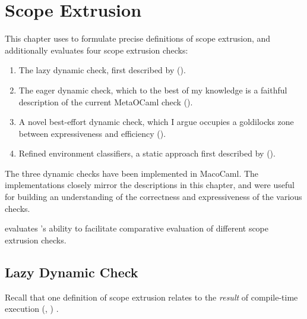 \chapter{Scope Extrusion}\label{chapter:scope-extrusion}
This chapter uses \calculusName{} to formulate precise definitions of scope extrusion, and additionally evaluates four scope extrusion checks: 
\begin{enumerate}
  \item The lazy dynamic check, first described by \citet{kiselyov-14} ().
  \item The eager dynamic check, which to the best of my knowledge is a faithful description of the current MetaOCaml check ().
  \item A novel best-effort dynamic check, which I argue occupies a goldilocks zone between expressiveness and efficiency ().
  \item Refined environment classifiers, a static approach first described by \citet{kiselyov-16} ().
\end{enumerate}
The three dynamic checks have been implemented in MacoCaml. The implementations closely mirror the descriptions in this chapter, and were useful for building an understanding of the correctness and expressiveness of the various checks. 

 evaluates \calculusName{}'s ability to facilitate comparative evaluation of different scope extrusion checks.

\section{Lazy Dynamic Check}\label{section:lazy-dynamic-check-formal}
Recall that one definition of scope extrusion relates to the \textit{result} of compile-time execution (, ) \citep{kiselyov-14}. 



